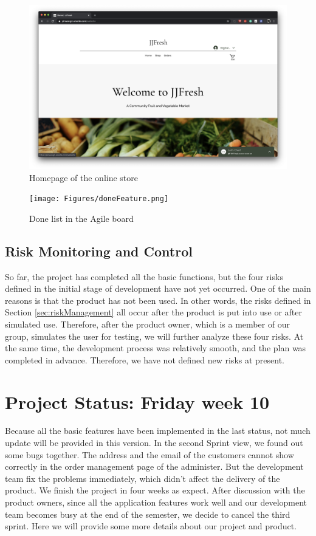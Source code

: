 \begin{figure}[htp]
\centering
\includegraphics[width=\textwidth]{Figures/homepage.png}
\caption{Homepage of the online store}
\label{fig:homepage}
\end{figure}

\begin{figure}[htp]
\centering
\texttt{[image: Figures/doneFeature.png]}
\caption{Done list in the Agile board}
\label{fig:doneFeature}
\end{figure}

\clearpage
\subsection{Risk Monitoring and Control}
\label{sub:riskMonitoringandControl}
So far, the project has completed all the basic functions, but the four risks defined in the initial stage of development have not yet occurred. One of the main reasons is that the product has not been used. In other words, the risks defined in Section \ref{sec:riskManagement} all occur after the product is put into use or after simulated use. Therefore, after the product owner, which is a member of our group, simulates the user for testing, we will further analyze these four risks.
At the same time, the development process was relatively smooth, and the plan was completed in advance. Therefore, we have not defined new risks at present.


\section{Project Status: Friday week 10}
\label{sec:ps2}
Because all the basic features have been implemented in the last status, not much update will be provided in this version. In the second Sprint view, we found out some bugs together. The address and the email of the customers cannot show correctly in the order management page of the administer. But the development team fix the problems immediately, which didn't affect the delivery of the product. We finish the project in four weeks as expect. After discussion with the product owners, since all the application features work well and our development team becomes busy at the end of the semester, we decide to cancel the third sprint. Here we will provide some more details about our project and product.

